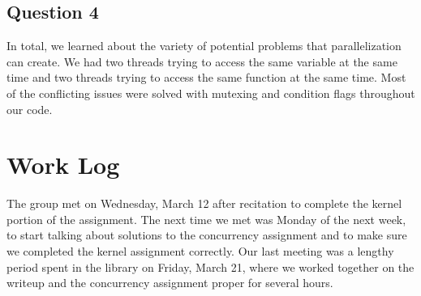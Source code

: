 \documentclass[letterpaper,10pt]{article}
\begin{document}
\subsection{Question 4}
    In total, we learned about the variety of potential problems that parallelization can create. We had two threads trying to access the same variable at the same time and two threads trying to access the same function at the same time. Most of the conflicting issues were solved with mutexing and condition flags throughout our code.

\section{Work Log}
     The group met on Wednesday, March 12 after recitation to complete the kernel portion of the assignment. The next time we met was Monday of the next week, to start talking about solutions to the concurrency assignment and to make sure we completed the kernel assignment correctly. Our last meeting was a lengthy period spent in the library on Friday, March 21, where we worked together on the writeup and the concurrency assignment proper for several hours. 
     
\end{document}
